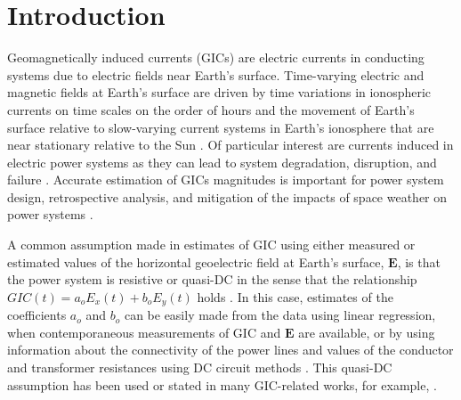 \documentclass[draft,linenumbers]{agujournal2018}
\begin{document}
\section{Introduction}

Geomagnetically induced currents (GICs) are electric currents in conducting systems due to electric fields near Earth's surface. Time-varying electric and magnetic fields at Earth's surface are driven by time variations in ionospheric currents on time scales on the order of hours \citep{Ohtani2000} and the movement of Earth's surface relative to slow-varying current systems in Earth's ionosphere that are near stationary relative to the Sun \citep{Stening2013}. Of particular interest are currents induced in electric power systems as they can lead to system degradation, disruption, and failure \citep{Albertson1993,NERC2012}. Accurate estimation of GICs magnitudes is important for power system design, retrospective analysis, and mitigation of the impacts of space weather on power systems \citep{Molinski2002,Thomson2010,NERC2012,Gaunt2014}. 

A common assumption made in estimates of GIC using either measured or estimated values of the horizontal geoelectric field at Earth's surface, $\mathbf{E}$, is that the power system is resistive or quasi-DC in the sense that the relationship $GIC(t) = a_oE_x(t) + b_oE_y(t)$ holds \citep{Albertson1981,Lehtinen1985}. In this case, estimates of the coefficients $a_o$ and $b_o$ can be easily made from the data using linear regression, when contemporaneous measurements of GIC and $\mathbf{E}$ are available, or by using information about the connectivity of the power lines and values of the conductor and transformer resistances using DC circuit methods \citep[e.g.][]{Boteler2014a,Boteler2014b}. This quasi-DC assumption has been used or stated in many GIC-related works, for example, \citet{Pulkkinen2007,Wik2008,Pulkkinen2010,Ngwira2011,Horton2012,Viljanen2012,Overbye2012,Marshall2013,Liu2014,Zheng2014,Watari2015,Bonner2017}. 


\end{document}
